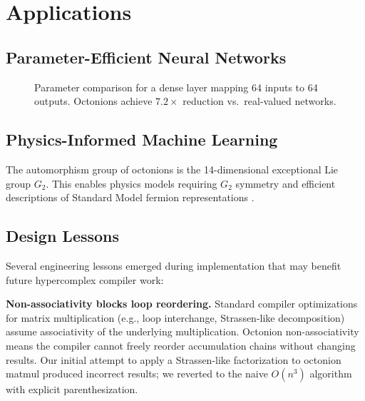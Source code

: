 \documentclass[11pt,a4paper]{article}
\begin{document}
\section{Applications}
\label{sec:applications}

\subsection{Parameter-Efficient Neural Networks}

\begin{figure}[h]
\centering
{}
\caption{Parameter comparison for a dense layer mapping 64 inputs to 64 outputs. Octonions achieve $7.2\times$ reduction vs.\ real-valued networks.}
\label{fig:params}
\end{figure}

\subsection{Physics-Informed Machine Learning}

The automorphism group of octonions is the 14-dimensional exceptional Lie group $G_2$. This enables physics models requiring $G_2$ symmetry and efficient descriptions of Standard Model fermion representations \cite{furey2018,todorov2021}.

\subsection{Design Lessons}

Several engineering lessons emerged during implementation that may benefit future hypercomplex compiler work:

\textbf{Non-associativity blocks loop reordering.} Standard compiler optimizations for matrix multiplication (e.g., loop interchange, Strassen-like decomposition) assume associativity of the underlying multiplication. Octonion non-associativity means the compiler cannot freely reorder accumulation chains without changing results. Our initial attempt to apply a Strassen-like factorization to octonion matmul produced incorrect results; we reverted to the naive $O(n^3)$ algorithm with explicit parenthesization.
\end{document}
